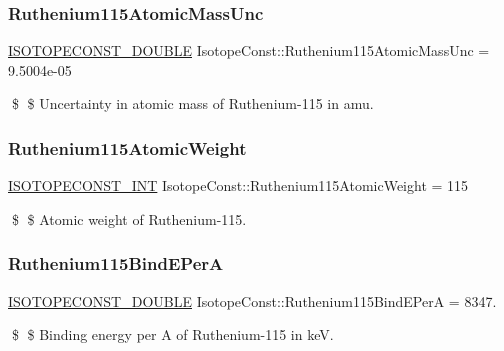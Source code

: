\subsubsection{\texorpdfstring{Ruthenium115\+Atomic\+Mass\+Unc}{Ruthenium115AtomicMassUnc}}
{\footnotesize\ttfamily \mbox{\hyperlink{group___isotope_const-_macros_ga8f45a7272ce02c0b4c65c44636ed719a}{I\+S\+O\+T\+O\+P\+E\+C\+O\+N\+S\+T\+\_\+\+D\+O\+U\+B\+LE}} Isotope\+Const\+::\+Ruthenium115\+Atomic\+Mass\+Unc = 9.\+5004e-\/05}

\$ \$ Uncertainty in atomic mass of Ruthenium-\/115 in amu. \mbox{\label{group___isotope_const-_ruthenium-_ru115_ga7a1996cb93cd76c329833c657f6d5aff}} 
\subsubsection{\texorpdfstring{Ruthenium115\+Atomic\+Weight}{Ruthenium115AtomicWeight}}
{\footnotesize\ttfamily \mbox{\hyperlink{group___isotope_const-_macros_ga5f18360b3e99483a35c32d789e62621c}{I\+S\+O\+T\+O\+P\+E\+C\+O\+N\+S\+T\+\_\+\+I\+NT}} Isotope\+Const\+::\+Ruthenium115\+Atomic\+Weight = 115}

\$ \$ Atomic weight of Ruthenium-\/115. \mbox{\label{group___isotope_const-_ruthenium-_ru115_ga032049193c48b028494e271adfa7c553}} 
\subsubsection{\texorpdfstring{Ruthenium115\+Bind\+E\+PerA}{Ruthenium115BindEPerA}}
{\footnotesize\ttfamily \mbox{\hyperlink{group___isotope_const-_macros_ga8f45a7272ce02c0b4c65c44636ed719a}{I\+S\+O\+T\+O\+P\+E\+C\+O\+N\+S\+T\+\_\+\+D\+O\+U\+B\+LE}} Isotope\+Const\+::\+Ruthenium115\+Bind\+E\+PerA = 8347.}

\$ \$ Binding energy per A of Ruthenium-\/115 in keV. \mbox{\label{group___isotope_const-_ruthenium-_ru115_ga7fe2413b27f746142af60403c50b44e1}} 
